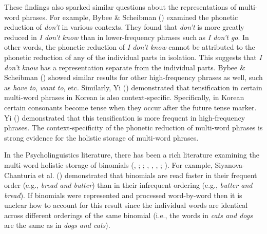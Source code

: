 \documentclass[
  12pt,
]{scrartcl}
\begin{document}
These findings also sparked similar questions about the representations
of multi-word phrases. For example, Bybee \& Scheibman
() examined the phonetic
reduction of \emph{don't} in various contexts. They found that
\emph{don't} is more greatly reduced in \emph{I don't know} than in
lower-frequency phrases such as \emph{I don't go}. In other words, the
phonetic reduction of \emph{I don't know} cannot be attributed to the
phonetic reduction of any of the individual parts in isolation. This
suggests that \emph{I don't know} has a representation separate from the
individual parts. Bybee \& Scheibman
() showed similar
results for other high-frequency phrases as well, such as \emph{have
to}, \emph{want to}, etc. Similarly, Yi
() demonstrated that
tensification in certain multi-word phrases in Korean is also
context-specific. Specifically, in Korean certain consonants become
tense when they occur after the future tense marker. Yi
() demonstrated that
this tensification is more frequent in high-frequency phrases. The
context-specificity of the phonetic reduction of multi-word phrases is
strong evidence for the holistic storage of multi-word phrases.

In the Psycholinguistics literature, there has been a rich literature
examining the multi-word holistic storage of binomials
(,
;
;
, ,
,
;
). For example, Siyanova-Chanturia et al.
()
demonstrated that binomials are read faster in their frequent order
(e.g., \emph{bread and butter}) than in their infrequent ordering (e.g.,
\emph{butter and bread}). If binomials were represented and processed
word-by-word then it is unclear how to account for this result since the
individual words are identical across different orderings of the same
binomial (i.e., the words in \emph{cats and dogs} are the same as in
\emph{dogs and cats}).\\
\end{document}
